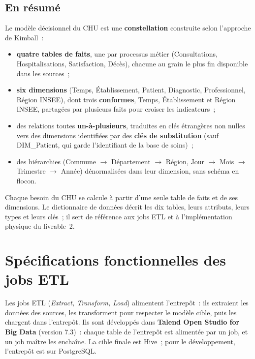 \subsection*{En résumé}

\noindent Le modèle décisionnel du CHU est une \textbf{constellation} construite selon l'approche de Kimball~:
\begin{itemize}
	\item \textbf{quatre tables de faits}, une par processus métier (Consultations, Hospitalisations, Satisfaction, Décès), chacune au grain le plus fin disponible dans les sources~;
	\item \textbf{six dimensions} (Temps, Établissement, Patient, Diagnostic, Professionnel, Région INSEE), dont trois \textbf{conformes}, Temps, Établissement et Région INSEE, partagées par plusieurs faits pour croiser les indicateurs~;
	\item des relations toutes \textbf{un-à-plusieurs}, traduites en clés étrangères non nulles vers des dimensions identifiées par des \textbf{clés de substitution} (sauf DIM\_Patient, qui garde l'identifiant de la base de soins)~;
	\item des hiérarchies (Commune $\rightarrow$ Département $\rightarrow$ Région, Jour $\rightarrow$ Mois $\rightarrow$ Trimestre $\rightarrow$ Année) dénormalisées dans leur dimension, sans schéma en flocon.
\end{itemize}

\noindent Chaque besoin du CHU se calcule à partir d'une seule table de faits et de ses dimensions. Le dictionnaire de données décrit les dix tables, leurs attributs, leurs types et leurs clés~; il sert de référence aux jobs ETL et à l'implémentation physique du livrable~2.

\newpage
\section{Spécifications fonctionnelles des jobs ETL}\label{sec:etl}

\noindent Les jobs ETL (\textit{Extract, Transform, Load}) alimentent l'entrepôt~: ils extraient les données des sources, les transforment pour respecter le modèle cible, puis les chargent dans l'entrepôt. Ils sont développés dans \textbf{Talend Open Studio for Big Data} (version 7.3)~: chaque table de l'entrepôt est alimentée par un job, et un job maître les enchaîne. La cible finale est Hive~; pour le développement, l'entrepôt est sur PostgreSQL.


